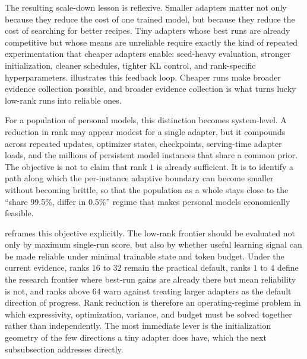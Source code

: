 The resulting scale-down lesson is reflexive. Smaller adapters matter not only because they reduce the cost of one trained model, but because they reduce the cost of searching for better recipes. Tiny adapters whose best runs are already competitive but whose means are unreliable require exactly the kind of repeated experimentation that cheaper adapters enable: seed-heavy evaluation, stronger initialization, cleaner schedules, tighter KL control, and rank-specific hyperparameters.  illustrates this feedback loop. Cheaper runs make broader evidence collection possible, and broader evidence collection is what turns lucky low-rank runs into reliable ones.



For a population of personal models, this distinction becomes system-level. A reduction in rank may appear modest for a single adapter, but it compounds across repeated updates, optimizer states, checkpoints, serving-time adapter loads, and the millions of persistent model instances that share a common prior. The objective is not to claim that rank $1$ is already sufficient. It is to identify a path along which the per-instance adaptive boundary can become smaller without becoming brittle, so that the population as a whole stays close to the ``share 99.5\%, differ in 0.5\%'' regime that makes personal models economically feasible.



 reframes this objective explicitly. The low-rank frontier should be evaluated not only by maximum single-run score, but also by whether useful learning signal can be made reliable under minimal trainable state and token budget. Under the current evidence, ranks $16$ to $32$ remain the practical default, ranks $1$ to $4$ define the research frontier where best-run gains are already there but mean reliability is not, and ranks above $64$ warn against treating larger adapters as the default direction of progress. Rank reduction is therefore an operating-regime problem in which expressivity, optimization, variance, and budget must be solved together rather than independently. The most immediate lever is the initialization geometry of the few directions a tiny adapter does have, which the next subsubsection addresses directly.


